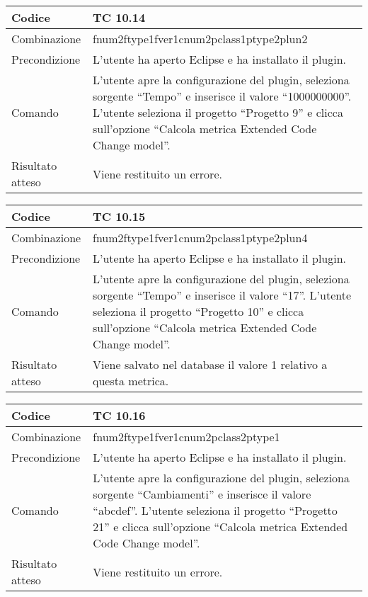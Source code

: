 \begin{table}[ht]
\begin{tabular}{|p{3cm}|p{9cm}|}
\hline
\cellcolor{lightgray}Codice				& TC 10.14								\\
\hline
\cellcolor{lightgray}Combinazione		& fnum2ftype1fver1cnum2pclass1ptype2plun2									\\
\hline
\cellcolor{lightgray}Precondizione		& L'utente ha aperto Eclipse e ha installato il plugin.		\\
\hline
\cellcolor{lightgray}Comando			& L'utente apre la configurazione del plugin, seleziona sorgente ``Tempo'' e inserisce il valore ``1000000000''. L'utente seleziona il progetto ``Progetto 9''  e clicca sull'opzione ``Calcola metrica Extended Code Change model''.	\\
\hline
\cellcolor{lightgray}Risultato atteso	& Viene restituito un errore.\\
\hline
\end{tabular}
\end{table}

\clearpage

\begin{table}[ht]
\begin{tabular}{|p{3cm}|p{9cm}|}
\hline
\cellcolor{lightgray}Codice				& TC 10.15								\\
\hline
\cellcolor{lightgray}Combinazione		& fnum2ftype1fver1cnum2pclass1ptype2plun4									\\
\hline
\cellcolor{lightgray}Precondizione		& L'utente ha aperto Eclipse e ha installato il plugin.		\\
\hline
\cellcolor{lightgray}Comando			& L'utente apre la configurazione del plugin, seleziona sorgente ``Tempo'' e inserisce il valore ``17''. L'utente seleziona il progetto ``Progetto 10''  e clicca sull'opzione ``Calcola metrica Extended Code Change model''.	\\
\hline
\cellcolor{lightgray}Risultato atteso	& Viene salvato nel database il valore 1 relativo a questa metrica.\\
\hline
\end{tabular}
\end{table}

\begin{table}[ht]
\begin{tabular}{|p{3cm}|p{9cm}|}
\hline
\cellcolor{lightgray}Codice				& TC 10.16								\\
\hline
\cellcolor{lightgray}Combinazione		& fnum2ftype1fver1cnum2pclass2ptype1									\\
\hline
\cellcolor{lightgray}Precondizione		& L'utente ha aperto Eclipse e ha installato il plugin.		\\
\hline
\cellcolor{lightgray}Comando			& L'utente apre la configurazione del plugin, seleziona sorgente ``Cambiamenti'' e inserisce il valore ``abcdef''. L'utente seleziona il progetto ``Progetto 21''  e clicca sull'opzione ``Calcola metrica Extended Code Change model''.	\\
\hline
\cellcolor{lightgray}Risultato atteso	& Viene restituito un errore.\\
\hline
\end{tabular}
\end{table}


